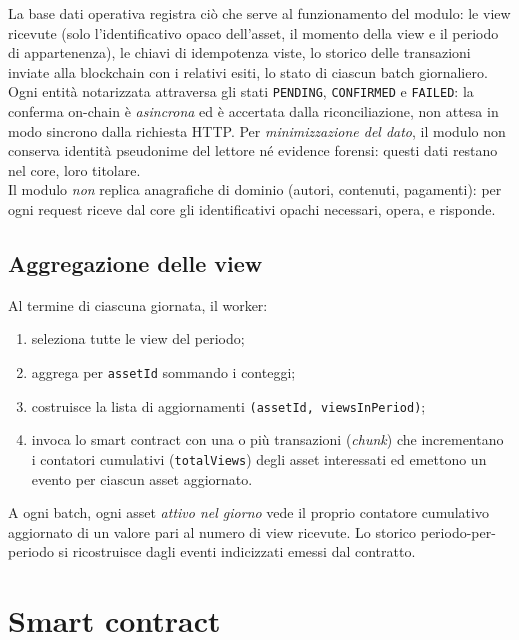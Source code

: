 \documentclass[a4paper,11pt]{article}
\begin{document}
La base dati operativa registra ci\`o che serve al funzionamento del modulo: le view ricevute (solo l'identificativo opaco dell'asset, il momento della view e il periodo di appartenenza), le chiavi di idempotenza viste, lo storico delle transazioni inviate alla blockchain con i relativi esiti, lo stato di ciascun batch giornaliero. Ogni entit\`a notarizzata attraversa gli stati \texttt{PENDING}, \texttt{CONFIRMED} e \texttt{FAILED}: la conferma on-chain \`e \emph{asincrona} ed \`e accertata dalla riconciliazione, non attesa in modo sincrono dalla richiesta HTTP. Per \emph{minimizzazione del dato}, il modulo non conserva identit\`a pseudonime del lettore n\'e evidence forensi: questi dati restano nel core, loro titolare. \\ Il modulo \emph{non} replica anagrafiche di dominio (autori, contenuti, pagamenti): per ogni request riceve dal core gli identificativi opachi necessari, opera, e risponde.

\subsection{Aggregazione delle view}

Al termine di ciascuna giornata, il worker:
\begin{enumerate}[leftmargin=*, itemsep=0.1em]
    \item seleziona tutte le view del periodo;
    \item aggrega per \texttt{assetId} sommando i conteggi;
    \item costruisce la lista di aggiornamenti \texttt{(assetId, viewsInPeriod)};
    \item invoca lo smart contract con una o pi\`u transazioni (\emph{chunk}) che incrementano i contatori cumulativi (\texttt{totalViews}) degli asset interessati ed emettono un evento per ciascun asset aggiornato.
\end{enumerate}

\noindent A ogni batch, ogni asset \emph{attivo nel giorno} vede il proprio contatore cumulativo aggiornato di un valore pari al numero di view ricevute. Lo storico periodo-per-periodo si ricostruisce dagli eventi indicizzati emessi dal contratto.

\section{Smart contract}\label{sec:smart-contract}
\end{document}
